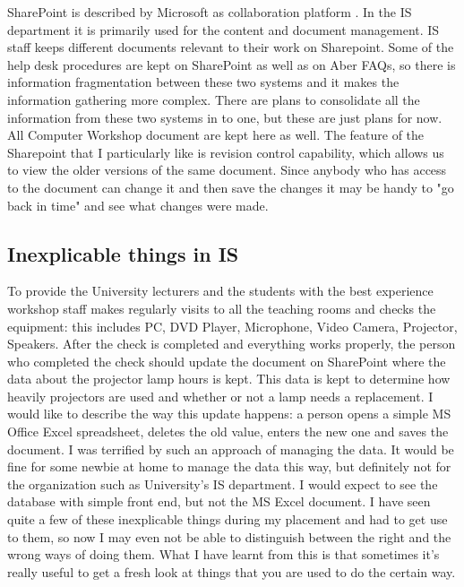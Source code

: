 \documentclass[10pt,a4paper,headinclude=true]{report}
\begin{document}
SharePoint is described by Microsoft as collaboration platform \cite{Sharepoint}. In the IS department it is primarily used  for the content and document management. IS staff keeps different documents relevant to their work on Sharepoint. Some of the help desk procedures are kept on SharePoint as well as on Aber FAQs, so there is information fragmentation between these two systems and it makes the information gathering more complex. There are plans to consolidate all the information from these two systems in to one, but these are just plans for now. All Computer Workshop document are kept here as well. The feature of the Sharepoint that I particularly like is revision control capability, which allows us to view the older versions of the same document. Since anybody who has access to the document can change it and then save the changes it may be handy to "go back in time" and see what changes were made.

\subsection{Inexplicable things in IS}
\label{sec:stupid}
To provide the University lecturers and the students with the best experience workshop staff makes regularly visits to all the teaching rooms and checks the equipment: this includes PC, DVD Player, Microphone, Video Camera, Projector, Speakers. After the check is completed and everything works properly, the person who completed the check should update the document on SharePoint where the data about the projector lamp hours is kept. This data is kept to determine how heavily projectors are used and whether or not a lamp needs a replacement. I would like to describe the way this update happens: a person opens a simple MS Office Excel spreadsheet, deletes the old value, enters the new one and saves the document. I was terrified by such an approach of managing the data. It would be fine for some newbie at home to manage the data this way, but definitely not for the organization such as University's IS department. I would expect to see the database with simple front end, but not the MS Excel document. I have seen quite a few of these inexplicable things during my placement and had to get use to them, so now I may even not be able to distinguish between the right and the wrong ways of doing them. What I have learnt from this is that sometimes it's really useful to get a fresh look at things that you are used to do the certain way.      
\end{document}
